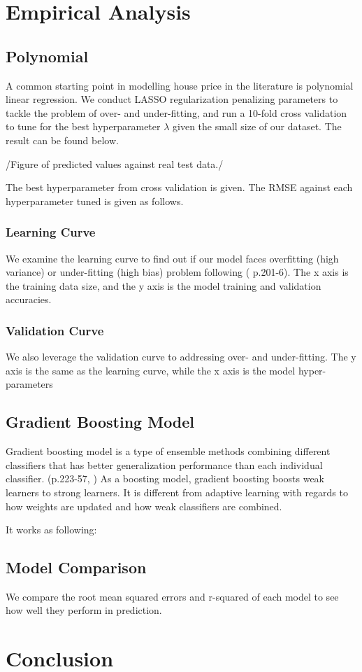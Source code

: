 \documentclass[12pt]{article} %
\begin{document}
\section{Empirical Analysis}
	\subsection{Polynomial}
		A common starting point in modelling house price in the literature is polynomial linear regression. We conduct LASSO regularization penalizing parameters to tackle the problem of over- and under-fitting, and run a 10-fold cross validation to tune for the best hyperparameter $\lambda$ given the small size of our dataset. The result can be found below.
		
		/Figure of predicted values against real test data./
		
		The best hyperparameter from cross validation is given. The RMSE against each hyperparameter tuned is given as follows.
		\subsubsection{Learning Curve}
			We examine the learning curve to find out if our model faces overfitting (high variance) or under-fitting (high bias) problem following (\cite{Raschka2019} p.201-6). The x axis is the training data size, and the y axis is the model training and validation accuracies.
		\subsubsection{Validation Curve}
			We also leverage the validation curve to addressing over- and under-fitting. The y axis is the same as the learning curve, while the x axis is the model hyper-parameters
	\subsection{Gradient Boosting Model}
		Gradient boosting model is a type of ensemble methods combining different classifiers that has better generalization performance than each individual classifier. (p.223-57, \cite{Raschka2019}) As a boosting model, gradient boosting boosts weak learners to strong learners. It is different from adaptive learning with regards to how weights are updated and how weak classifiers are combined.\par
		It works as following:
	\subsection{Model Comparison}
		We compare the root mean squared errors and r-squared of each model to see how well they perform in prediction. 
	
\section{Conclusion}
	
\newpage	
\footnotesize


\end{document}
